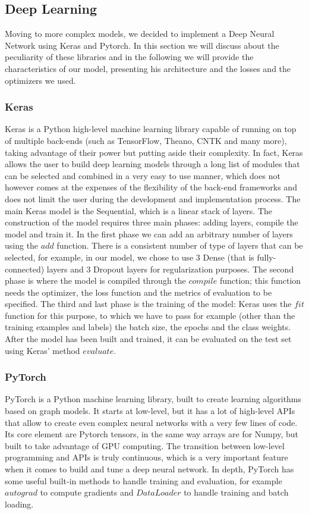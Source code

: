 \documentclass[12pt]{article}
\begin{document}
\subsection{Deep Learning}
Moving to more complex models, we decided to implement a Deep Neural Network using Keras and Pytorch. In this section we will discuss about the peculiarity of these libraries and in the following we will provide the characteristics of our model, presenting his architecture and the losses and the optimizers we used.   

\subsubsection{Keras}
Keras \cite{keras} is a Python high-level machine learning library capable of running on top of multiple back-ends (such as TensorFlow, Theano, CNTK and many more), taking advantage of their power but putting aside their complexity. In fact, Keras allows the user to build deep learning models through a long list of modules that can be selected and combined in a very easy to use manner, which does not however comes at the expenses of the flexibility of the back-end frameworks and does not limit the user during the development and implementation process. 
The main Keras model is the Sequential, which is a linear stack of layers. The construction of the model requires three main phases: adding layers, compile the model and train it. 
In the first phase we can add an arbitrary number of layers using the $add$ function. There is a consistent number of type of layers that can be selected, for example, in our model, we chose to use 3 Dense (that is fully-connected) layers and 3 Dropout layers for regularization purposes. 
The second phase is where the model is compiled through the $compile$ function; this function needs the optimizer, the loss function and the metrics of evaluation to be specified. 
The third and last phase is the training of the model: Keras uses the $fit$ function for this purpose, to which we have to pass for example (other than the training examples and labels) the batch size, the epochs and the class weights. 
After the model has been built and trained, it can be evaluated on the test set using Keras’ method $evaluate$.


\subsubsection{PyTorch}
PyTorch \cite{torch} is a Python machine learning library, built to create learning algorithms based on graph models. 
It starts at low-level, but it has a lot of high-level APIs that allow to create even complex neural networks with a very few lines of code.
Its core element are Pytorch tensors, in the same way arrays are for Numpy, but built to take advantage of GPU computing.
The transition between low-level programming and APIs is truly continuous, which is a very important feature when it comes to build and tune a deep neural network.
In depth, PyTorch has some useful built-in methods to handle training and evaluation, for example $autograd$ to compute gradients and $DataLoader$ to handle training and batch loading.
\end{document}
